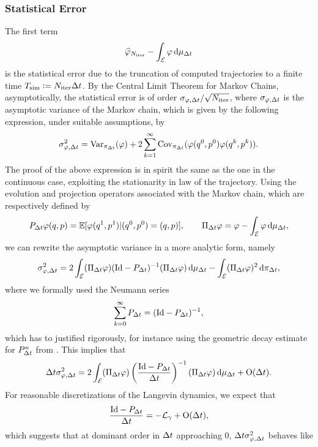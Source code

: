         \subsubsection{Statistical Error}
        The first term
        \[\widehat{\varphi}_{N_{\mathrm{iter}}} - \int_\mathcal{E}\varphi \,\mathrm{d} \mu_{{\Delta t}}\]
        is the statistical error due to the truncation of computed trajectories to a finite time $T_{\mathrm{sim}}\mathrel{\mathop:}= N_{\mathrm{iter}}{\Delta t}$. 
        By the Central Limit Theorem for Markov Chains, asymptotically, the statistical error is of order
        $\sigma_{\varphi,{\Delta t}}/\sqrt{N_{\mathrm{iter}}}$,
        where $\sigma_{\varphi,{\Delta t}}$ is the asymptotic variance of the Markov chain, which is given by the following expression, under suitable assumptions, by
        \[\sigma_{\varphi,{\Delta t}}^2=\mathrm{Var}_{\pi_{\Delta t}}(\varphi)+2\sum_{k=1}^\infty \mathrm{Cov}_{\pi_{\Delta t}}(\varphi(q^0,p^0)\varphi(q^k,p^k)).\]
        The proof of the above expression is in spirit the same as the one in the continuous case, exploiting the stationarity in law of the trajectory.
        Using the evolution and projection operators associated with the Markov chain, which are respectively defined by
        \begin{equation}
            \label{eq:markov_chain_operators}
            P_{{\Delta t}}\varphi(q,p)=\mathbb{E}[\varphi(q^1,p^1)|(q^0,p^0)=(q,p)],\qquad \Pi_{\Delta t} \varphi=\varphi - \int_{\mathcal E}\varphi \,\mathrm{d} \mu_{{\Delta t}},
        \end{equation}
        we can rewrite the asymptotic variance in a more analytic form, namely
        \begin{equation}
            \label{eq:asymptotic_variance_markov_chain}
            \sigma_{\varphi,{\Delta t}}^2=2\int_{\mathcal E}(\Pi_{{\Delta t}}\varphi)(\mathrm{Id}-P_{\Delta t})^{-1}(\Pi_{\Delta t} \varphi)\,\mathrm{d}\mu_{{\Delta t}}-\int_{\mathcal E}(\Pi_{\Delta t} \varphi)^2\,\mathrm{d} \pi_{\Delta t},
        \end{equation}
        where we formally used the Neumann series
        \[\sum_{k=0}^\infty P_{\Delta t}=(\mathrm{Id}-P_{\Delta t})^{-1},\]
        which has to justified rigorously, for instance using the geometric decay estimate for $P_{\Delta t}^n$ from \cite[Proposition 2.9]{LMS13}.
        This implies that 
        \[{\Delta t}\sigma_{\varphi,{\Delta t}}^2=2\int_{\mathcal E}(\Pi_{{\Delta t}}\varphi)\left(\frac{\mathrm{Id}-P_{\Delta t}}{{\Delta t}}\right)^{-1}(\Pi_{\Delta t} \varphi)\,\mathrm{d}\mu_{{\Delta t}}+\mathrm{O}({\Delta t}).\]
        For reasonable discretizations of the Langevin dynamics, we expect that 
        \[\frac{\mathrm{Id}-P_{\Delta t}}{{\Delta t}}=-\mathcal{L}_\gamma+\mathrm{O}({\Delta t}),\]
        which suggests that at dominant order in ${\Delta t}$ approaching $0$, ${\Delta t}\sigma_{\varphi,{\Delta t}}^2$ behaves like
